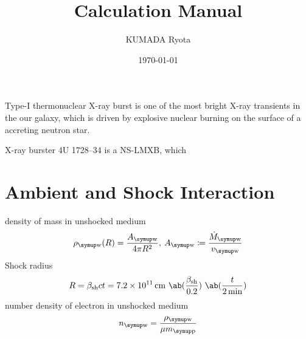 \documentclass{notebook}
\title{Calculation Manual}
\author{KUMADA Ryota}
\date{\today}
\begin{document}
\maketitle
\section{}
Type-I thermonuclear X-ray burst is
one of the most bright X-ray transients
in the our galaxy,
which is driven by
explosive nuclear burning
on the surface of a accreting neutron star.

X-ray burster 4U 1728--34 is
a NS-LMXB, which 

  
\section{Ambient and Shock Interaction}
density of mass in unshocked medium
\begin{equation}
  \label{eq:def-rhowind}
  \rho_{\wind}(R)
  = \frac{\Awind}{4\pi R^2}
  ,\:
  \Awind \coloneq \frac{\dot{M}_{\wind}}{v_{\wind}}
\end{equation}
Shock radius
\begin{equation}
  R = \betash c t
  =
  \qty{7.2e11}{\cm}
  ~\ab(\frac{\betash}{\num{0.2}})
  ~\ab(\frac{t}{\qty{2}{\min}})
\end{equation}
number density of electron in unshocked medium
\begin{equation}
  n_{\wind} 
  = \frac{\rho_{\wind}}{\mu \mpro} 
\end{equation}
\end{document}

